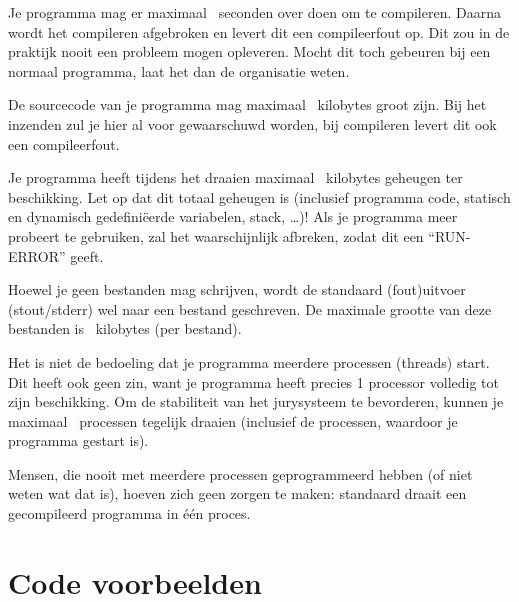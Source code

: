 \documentclass[11pt,titlepage,a4paper]{article}
\begin{document}
\begin{description}
\item[compile-tijd]
Je programma mag er maximaal \COMPILETIME\ seconden over doen om te
compileren. Daarna wordt het compileren afgebroken en levert dit een
compileerfout op. Dit zou in de praktijk nooit een probleem mogen
opleveren. Mocht dit toch gebeuren bij een normaal programma, laat het
dan de organisatie weten.

\item[source grootte]
De sourcecode van je programma mag maximaal \SOURCESIZE\ kilobytes
groot zijn. Bij het inzenden zul je hier al voor gewaarschuwd worden,
bij compileren levert dit ook een compileerfout.

\item[geheugen]
Je programma heeft tijdens het draaien maximaal \MEMLIMIT\ kilobytes
geheugen ter beschikking. Let op dat dit totaal geheugen is (inclusief
programma code, statisch en dynamisch gedefini\"eerde variabelen,
stack, \dots)! Als je programma meer probeert te gebruiken, zal het
waarschijnlijk afbreken, zodat dit een ``RUN-ERROR'' geeft.

\item[bestandsgrootte]
Hoewel je geen bestanden mag schrijven, wordt de standaard (fout)uitvoer
(stout/stderr) wel naar een bestand geschreven. De maximale grootte
van deze bestanden is \FILELIMIT\ kilobytes (per bestand).

\item[aantal processen]
Het is niet de bedoeling dat je programma meerdere processen (threads)
start. Dit heeft ook geen zin, want je programma heeft precies 1
processor volledig tot zijn beschikking. Om de stabiliteit van het
jurysysteem te bevorderen, kunnen je maximaal \PROCLIMIT\ processen
tegelijk draaien (inclusief de processen, waardoor je programma
gestart is).

Mensen, die nooit met meerdere processen geprogrammeerd hebben (of
niet weten wat dat is), hoeven zich geen zorgen te maken: standaard
draait een gecompileerd programma in \'e\'en proces.

\end{description}


\newpage
\appendix

\section{Code voorbeelden}\label{codevoorbeeld}
\end{document}
